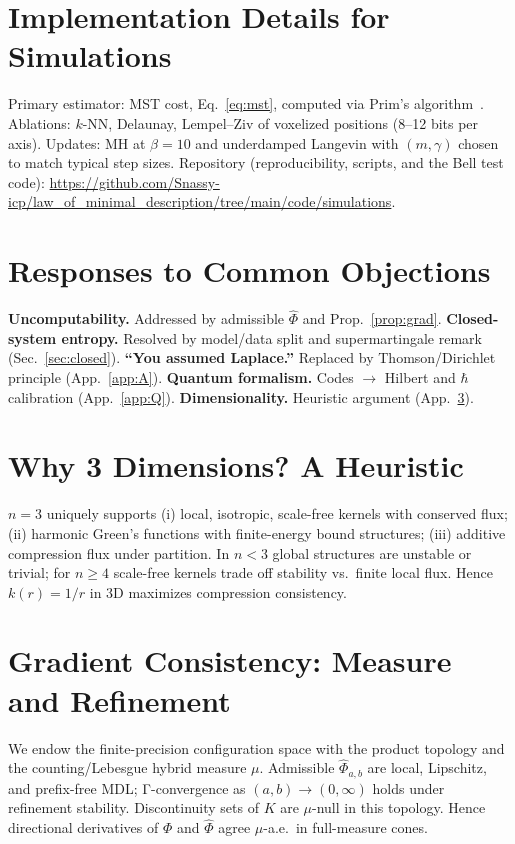 \documentclass[aps,preprint,onecolumn,longbibliography,nofootinbib]{revtex4-2}
\numberwithin{equation}{section}        %
\begin{document}
\section{Implementation Details for Simulations}\label{app:C}
Primary estimator: MST cost, Eq.~\eqref{eq:mst}, computed via Prim's algorithm~\cite{Prim1957}. Ablations: $k$-NN, Delaunay, Lempel–Ziv of voxelized positions (8–12 bits per axis). Updates: MH at $\beta{=}10$ and underdamped Langevin with $(m,\gamma)$ chosen to match typical step sizes. Repository (reproducibility, scripts, and the Bell test code): \url{https://github.com/Snassy-icp/law_of_minimal_description/tree/main/code/simulations}.

\section{Responses to Common Objections}\label{app:D}
\textbf{Uncomputability.} Addressed by admissible $\widehat\Phi$ and Prop.~\ref{prop:grad}. \textbf{Closed-system entropy.} Resolved by model/data split and supermartingale remark (Sec.~\ref{sec:closed}). \textbf{“You assumed Laplace.”} Replaced by Thomson/Dirichlet principle (App.~\ref{app:A}). \textbf{Quantum formalism.} Codes $\to$ Hilbert and $\hbar$ calibration (App.~\ref{app:Q}). \textbf{Dimensionality.} Heuristic argument (App.~\ref{app:E}).

\section{Why 3 Dimensions? A Heuristic}\label{app:E}
$n{=}3$ uniquely supports (i) local, isotropic, scale-free kernels with conserved flux; (ii) harmonic Green's functions with finite-energy bound structures; (iii) additive compression flux under partition. In $n{<}3$ global structures are unstable or trivial; for $n{\ge}4$ scale-free kernels trade off stability vs.\ finite local flux. Hence $k(r)=1/r$ in $3$D maximizes compression consistency.

\section{Gradient Consistency: Measure and Refinement}\label{app:grad}
We endow the finite-precision configuration space with the product topology and the counting/Lebesgue hybrid measure $\mu$. Admissible $\widehat\Phi_{a,b}$ are local, Lipschitz, and prefix-free MDL; Γ-convergence as $(a,b)\to (0,\infty)$ holds under refinement stability. Discontinuity sets of $K$ are $\mu$-null in this topology. Hence directional derivatives of $\Phi$ and $\widehat\Phi$ agree $\mu$-a.e.\ in full-measure cones.
\end{document}

